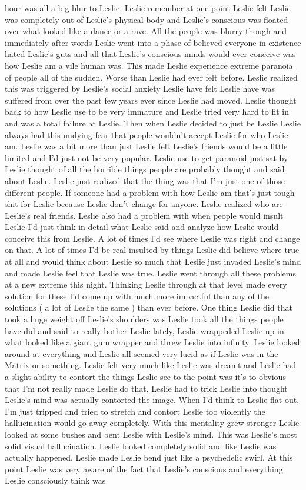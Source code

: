 \documentclass[12pt]{book}
\begin{document}
hour was all a big blur to Leslie. Leslie remember at one point Leslie felt Leslie was completely out of Leslie's physical body and Leslie's conscious was floated over what looked like a dance or a rave. All the people was blurry though and immediately after words Leslie went into a phase of believed everyone in existence hated Leslie's guts and all that Leslie's conscious minds would ever conceive was how Leslie am a vile human was. This made Leslie experience extreme paranoia of people all of the sudden. Worse than Leslie had ever felt before. Leslie realized this was triggered by Leslie's social anxiety Leslie have felt Leslie have was suffered from over the past few years ever since Leslie had moved. Leslie thought back to how Leslie use to be very immature and Leslie tried very hard to fit in and was a total failure at Leslie. Then when Leslie decided to just be Leslie Leslie always had this undying fear that people wouldn't accept Leslie for who Leslie am. Leslie was a bit more than just Leslie felt Leslie's friends would be a little limited and I'd just not be very popular. Leslie use to get paranoid just sat by Leslie thought of all the horrible things people are probably thought and said about Leslie. Leslie just realized that the thing was that I'm just one of those different people. If someone had a problem with how Leslie am that's just tough shit for Leslie because Leslie don't change for anyone. Leslie realized who are Leslie's real friends. Leslie also had a problem with when people would insult Leslie I'd just think in detail what Leslie said and analyze how Leslie would conceive this from Leslie. A lot of times I'd see where Leslie was right and change on that. A lot of times I'd be real insulted by things Leslie did believe where true at all and would think about Leslie so much that Leslie just invaded Leslie's mind and made Leslie feel that Leslie was true. Leslie went through all these problems at a new extreme this night. Thinking Leslie through at that level made every solution for these I'd come up with much more impactful than any of the solutions ( a lot of Leslie the same ) than ever before. One thing Leslie did that took a huge weight off Leslie's shoulders was Leslie took all the things people have did and said to really bother Leslie lately, Leslie wrappeded Leslie up in what looked like a giant gum wrapper and threw Leslie into infinity. Leslie looked around at everything and Leslie all seemed very lucid as if Leslie was in the Matrix or something. Leslie felt very much like Leslie was dreamt and Leslie had a slight ability to contort the things Leslie see to the point was it's to obvious that I'm not really made Leslie do that. Leslie had to trick Leslie into thought Leslie's mind was actually contorted the image. When I'd think to Leslie flat out, I'm just tripped and tried to stretch and contort Leslie too violently the hallucination would go away completely. With this mentality grew stronger Leslie looked at some bushes and bent Leslie with Leslie's mind. This was Leslie's most solid visual hallucination. Leslie looked completely solid and like Leslie was actually happened. Leslie made Leslie bend just like a psychedelic swirl. At this point Leslie was very aware of the fact that Leslie's conscious and everything Leslie consciously think was 
\end{document}
